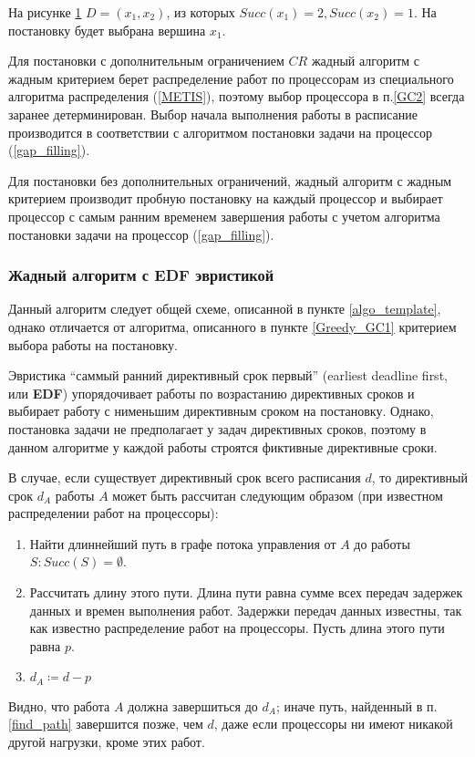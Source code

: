 \begin{figure}[!htbp]
    \caption{}
    \label{fig:max-children}
\end{figure}
На рисунке \ref{fig:max-children} $D = \left( x_1, x_2 \right)$, из которых $Succ(x_1) = 2, Succ(x_2) = 1$. На постановку будет выбрана вершина $x_1$. 

Для постановки с дополнительным ограничением $CR$ жадный алгоритм с жадным критерием берет распределение работ по процессорам из специального алгоритма распределения (\ref{METIS}), поэтому выбор процессора в п.\ref{GC2} всегда заранее детерминирован. Выбор начала выполнения работы в расписание производится в соответствии с алгоритмом постановки задачи на процессор (\ref{gap_filling}).

Для постановки без дополнительных ограничений, жадный алгоритм с жадным критерием производит пробную постановку на каждый процессор и выбирает процессор с самым ранним временем завершения работы с учетом алгоритма постановки задачи на процессор (\ref{gap_filling}). 

\subsubsection{Жадный алгоритм с EDF эвристикой} \label{Greedy_EDF}
Данный алгоритм следует общей схеме, описанной в пункте \ref{algo_template}, однако отличается от алгоритма, описанного в пункте \ref{Greedy_GC1} критерием выбора работы на постановку.

Эвристика ``саммый ранний директивный срок первый'' (earliest deadline first, или \textbf{EDF}) упорядочивает работы по возрастанию директивных сроков и выбирает работу с нименьшим директивным сроком на постановку. Однако, постановка задачи не предполагает у задач директивных сроков, поэтому в данном алгоритме у каждой работы строятся фиктивные директивные сроки.

В случае, если существует директивный срок всего расписания $d$, то директивный срок $d_A$ работы $A$ может быть рассчитан следующим образом (при известном распределении работ на процессоры):
\begin{enumerate}
    \item \label{find_path} Найти длиннейший путь в графе потока управления от $A$ до работы $S: Succ(S) = \emptyset$.
    \item Рассчитать длину этого пути. Длина пути равна сумме всех передач задержек данных и времен выполнения работ. Задержки передач данных известны, так как известно распределение работ на процессоры. Пусть длина этого пути равна $p$.
    \item $d_A \coloneqq d - p$
\end{enumerate}
Видно, что работа $A$ должна завершиться до $d_A$; иначе путь, найденный в п.\ref{find_path} завершится позже, чем $d$, даже если процессоры ни имеют никакой другой нагрузки, кроме этих работ.

